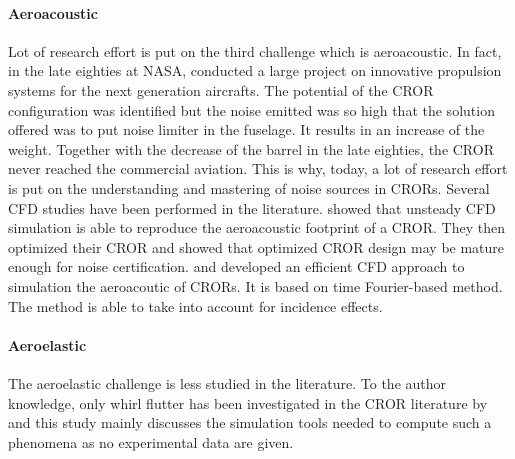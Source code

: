 \paragraph{Aeroacoustic}
Lot of research effort is put on the third challenge which
is aeroacoustic. In fact, in the late eighties at NASA, \citet{Hager1988}
conducted a large project on innovative propulsion systems for the
next generation aircrafts. The potential of the CROR configuration
was identified but the noise emitted was so high that the solution
offered was to put noise limiter in the fuselage. It results in 
an increase of the weight. Together with the decrease of the
barrel in the late eighties, the CROR never reached the commercial
aviation. This is why, today, a lot of research effort is put on the
understanding and mastering of noise sources in CRORs.
Several CFD studies have been performed in the literature.
\citet{Peters2012} showed that unsteady CFD simulation is able
to reproduce the aeroacoustic footprint of a CROR. They then optimized
their CROR and showed that optimized CROR design may be mature enough
for noise certification. \citet{Hoffer2012} and \citet{Ferrante2013}
developed an efficient CFD approach to simulation the aeroacoutic of CRORs.
It is based on time Fourier-based method. The method is able to
take into account for incidence effects.

\paragraph{Aeroelastic}
The aeroelastic challenge is less studied in the literature.
To the author knowledge, only whirl flutter has been investigated
in the CROR literature by \citet{Verley2013} and this study mainly
discusses the simulation tools needed to compute such a phenomena as
no experimental data are given.